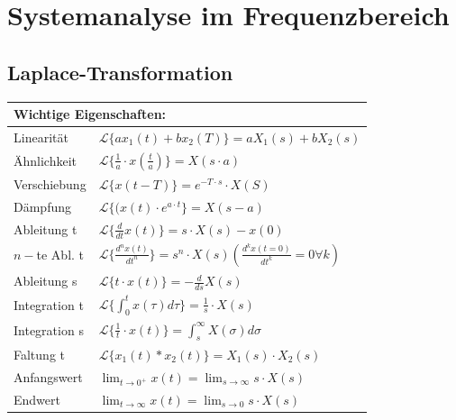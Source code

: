 \section{Systemanalyse im Frequenzbereich}
    \subsection{Laplace-Transformation}
    \begin{center}
        {\renewcommand{\arraystretch}{1.5}
        \begin{tabular}{l | l}
        \multicolumn{2}{l}{\textbf{Wichtige Eigenschaften:}}\\
            \hline
            Linearität  & $\mathcal{L}\{a x_1(t)+b x_2(T)\} = a X_1(s)+b X_2(s)$\\
            Ähnlichkeit & $\mathcal{L}\{\frac{1}{a}\cdot x(\frac{t}{a})\} =X(s\cdot a) $ \\
            Verschiebung & $\mathcal{L}\{x(t-T)\} = e^{-T\cdot s} \cdot X(S)$ \\
            Dämpfung & $\mathcal{L}\{(x(t)\cdot e^{a\cdot t}\} = X(s-a)$\\
            Ableitung t & $\mathcal{L}\{\frac{d}{dt}x(t)\} = s \cdot X(s) - x(0)$\\
            $n-$te Abl. t & $\mathcal{L}\{\frac{d^nx(t)}{dt^n}\} = s^n \cdot X(s)(\frac{d^kx(t=0)}{dt^k}= 0 \forall k)$\\
            Ableitung s & $\mathcal{L}\{t\cdot x(t)\} = -\frac{d}{ds}X(s)$\\
            Integration t & $\mathcal{L}\{\int_0^t x(\tau)d\tau\} = \frac{1}{s}\cdot X(s)$ \\
            Integration s &  $\mathcal{L}\{\frac{1}{t}\cdot x(t)\} = \int_s^\infty X(\sigma)d\sigma$ \\
            Faltung t & $\mathcal{L}\{x_1(t)*x_2(t)\} = X_1(s) \cdot X_2(s)$ \\ 
            Anfangswert & $\displaystyle\lim_{t \to 0^{+}}x(t) =\lim_{s \to \infty}s\cdot X(s)$ \\
            Endwert & $\displaystyle\lim_{t \to \infty}x(t) =\lim_{s \to 0}s\cdot X(s)$
             
        \end{tabular}}
    \end{center}
    
